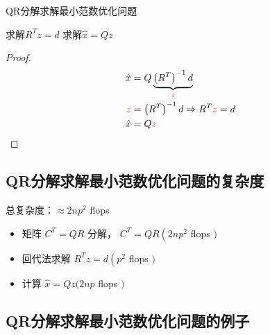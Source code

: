 \begin{algorithm}[htbp]
    \caption{QR分解求解最小范数优化问题}
    求解$R^T z=d$ \;
    求解$\hat{x} = Qz$\;
    
\end{algorithm}

\begin{proof}
    \begin{equation}\displaystyle \begin{aligned}
    \hat{x} & =Q\underbrace{\left( R^{T}\right)^{-1} d}_{\textcolor[rgb]{0.72,0.33,0.31}{z}}\\
    \textcolor[rgb]{0.72,0.33,0.31}{z} & =\left( R^{T}\right)^{-1} d\Rightarrow R^{T}\textcolor[rgb]{0.72,0.33,0.31}{z} =d\\
    \hat{x} & =Q\textcolor[rgb]{0.72,0.33,0.31}{z}
    \end{aligned}\end{equation}
\end{proof}


\subsection{QR分解求解最小范数优化问题的复杂度}

总复杂度：$ \approx 2 n p^{2} $ flops

\begin{itemize}
    \item 矩阵 $ C^{T}=Q R $ 分解， $ C^{T}=Q R\left(2 n p^{2}\right. $ flops $ ) $
    \item 回代法求解 $ R^{T} z=d\left(p^{2}\right. $ flops $ ) $
    \item 计算 $ \hat{x}=Q z(2 n p $ flops $ ) $
\end{itemize}



\subsection{QR分解求解最小范数优化问题的例子}

